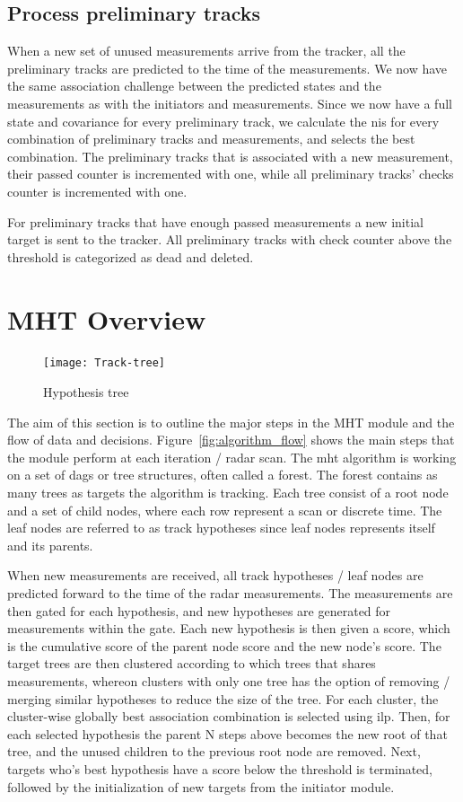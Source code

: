 \subsection{Process preliminary tracks}
When a new set of unused measurements arrive from the tracker, all the preliminary tracks are predicted to the time of the measurements. We now have the same association challenge between the predicted states and the measurements as with the initiators and measurements. Since we now have a full state and covariance for every preliminary track, we calculate the \gls{nis} for every combination of preliminary tracks and measurements, and selects the best combination. The preliminary tracks that is associated with a new measurement, their passed counter is incremented with one, while all preliminary tracks' checks counter is incremented with one. 

For preliminary tracks that have enough passed measurements a new initial target is sent to the tracker. All preliminary tracks with check counter above the threshold is categorized as dead and deleted. 

\section{MHT Overview}
\begin{figure}
 \centering
 \texttt{[image: Track-tree]}
 \caption{Hypothesis tree}\label{fig:hyp_tree}
\end{figure}
The aim of this section is to outline the major steps in the MHT module and the flow of data and decisions. Figure~\ref{fig:algorithm_flow} shows the main steps that the module perform at each iteration / radar scan. The \gls{mht} algorithm is working on a set of \glspl{dag} or  tree structures, often called a forest. The forest contains as many trees as targets the algorithm is tracking. Each tree consist of a root node and a set of child nodes, where each row represent a scan or discrete time. The leaf nodes are referred to as track hypotheses since leaf nodes represents itself and its parents.

 When new measurements are received, all track hypotheses / leaf nodes are predicted forward to the time of the radar measurements. The measurements are then gated for each hypothesis, and new hypotheses are generated for measurements within the gate. Each new hypothesis is then given a score, which is the cumulative score of the parent node score and the new node's score. The target trees are then clustered according to which trees that shares measurements, whereon clusters with only one tree has the option of removing / merging similar hypotheses to reduce the size of the tree. For each cluster, the cluster-wise globally best association combination is selected using \gls{ilp}. Then, for each selected hypothesis the parent N steps above becomes the new root of that tree, and the unused children to the previous root node are removed. Next, targets who's  best hypothesis have a score below the threshold is terminated, followed by the initialization of new targets from the initiator module. 

